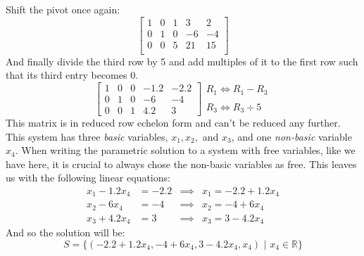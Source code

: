 \documentclass{tufte-book}
\begin{document}
Shift the pivot once again:
\begin{equation*}
	\left[
		\begin{array}{cccc|c}
			1 & 0 & 1         & 3  & 2  \\
			0 & 1 & 0         & -6 & -4 \\
			0 & 0 & \boxed{5} & 21 & 15 \\
		\end{array}
		\right]
\end{equation*}
And finally divide the third row by 5 and add multiples of it to the first row such that its third entry becomes 0.
\begin{equation*}
	\left[
		\begin{array}{cccc|c}
			1 & 0 & 0 & -1.2 & -2.2 \\
			0 & 1 & 0 & -6   & -4   \\
			0 & 0 & 1 & 4.2  & 3
		\end{array}
		\right]
	\begin{array}{l}
		R_1 \iff R_1 - R_3 \\
		\\
		R_3 \iff R_3 \div 5
	\end{array}
\end{equation*}
This matrix is in reduced row echelon form and can't be reduced any further. This system has three
\emph{basic}
variables, $x_1, x_2,$ and $x_3$, and one \emph{non-basic} variable $x_4$. When writing the parametric solution to a system
with free variables, like we have here, it is crucial to always chose the non-basic variables as free. This
leaves us with the following linear equations:
\begin{align*}
	x_1 -1.2x_4  & = -2.2 & \implies & x_1  =-2.2+1.2x_4 \\
	x_2 -6x_4    & = -4   & \implies & x_2  =-4+6x_4     \\
	x_3 + 4.2x_4 & = 3    & \implies & x_3  = 3-4.2x_4
\end{align*}
And so the solution will be:
\begin{equation*}
	S = \{(-2.2+1.2x_4,-4+6x_4,3-4.2x_4,x_4)\text{ | }x_4 \in \mathbb{R}\}
\end{equation*}
\end{document}

